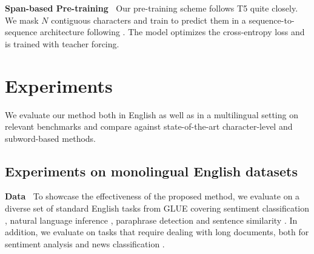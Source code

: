 \documentclass{article} \usepackage{iclr2022_conference,times}
\begin{document}
\noindent \textbf{Span-based Pre-training} $\:$ Our pre-training scheme follows T5 quite closely. We mask $N$ contiguous characters and train to predict them in a sequence-to-sequence architecture following \citet{Xue2021byt5}. The model optimizes the cross-entropy loss and is trained with teacher forcing.

\section{Experiments} \label{sec:experiments}

We evaluate our method both in English as well as in a multilingual setting on relevant benchmarks and compare against state-of-the-art character-level and subword-based methods.



\subsection{Experiments on monolingual English datasets} \label{sec:english-experiments}


\noindent \textbf{Data} $\:$ To showcase the effectiveness of the proposed method, we evaluate on a diverse set of standard English tasks from GLUE covering sentiment classification \citep[SST-2;][]{socher-etal-2013-recursive}, natural language inference \citep[MNLI, QNLI;][]{williams-etal-2018-broad,rajpurkar-etal-2016-squad}, paraphrase detection \citep[MRPC, QQP]{dolan2005automatically} and sentence similarity \citep{cer2017semeval}.  In addition, we evaluate on tasks that require dealing with long documents, both for sentiment analysis \citep[IMDb;][]{maas2011learning} and news classification \citep[AGNews;][]{Zhang2015character}.
\end{document}
